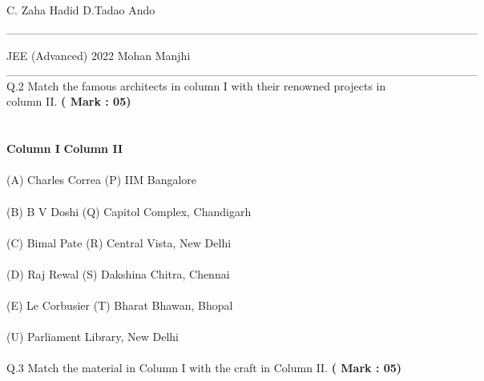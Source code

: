\documentclass[10pt]{article}
\begin{document}
\hspace*{4ex}C. Zaha Hadid   \tab D.Tadao Ando 
\\ \\
$$\textbf{------------------------------------------------------------------------------------------------------------------------------}$$
%
\begin{flushright}JEE (Advanced) 2022 \;\;\;\;\;\;\;\;\;\;\;\;\;\;\;\;\;\;\;\;\;\;\;\;\;\;\;\;\;\;\;\;\;\;\;\;\;\;\;\;\;\;\;\;\;\;\;\;\;\;\;\;\;\;\;\;\;\;\;\;\;\;\;\;\;\;\;\;\;\;\;\;\;\;\;\;\;\;\;\;\;\;\;\;\;\;\;\;\;\;\;\;\;\;\;\;\;\;\;\;\;\;\;\;\;\;\;\;\;\;\;Mohan Manjhi\end{flushright}
$$\textbf{------------------------------------------------------------------------------------------------------------------------------}$$
Q.2 Match the famous architects in column I with their renowned projects in column II. \hspace{10ex}\textbf{( Mark : 05)}\\
%
\\ \\ 
\hspace*{4ex}\textbf{Column I} \tab \textbf{Column II } 
\\ \\
\hspace*{4ex}(A) Charles Correa \tab (P) IIM Bangalore 
 \\ \\
\hspace*{4ex}(B) B V Doshi    \tab (Q)  Capitol Complex, Chandigarh 
\\ \\
\hspace*{4ex}(C) Bimal Pate \tab (R) Central Vista, New Delhi 
 \\ \\
\hspace*{4ex}(D)  Raj Rewal   \tab (S) Dakshina Chitra, Chennai  
\\ \\
\hspace*{4ex}(E)  Le Corbusier \tab (T) Bharat Bhawan, Bhopal 
 \\ \\
\hspace*{4ex} \tab (U) Parliament Library, New Delhi
\\ \\
%
Q.3 Match the material in Column I with the craft in Column II. \hspace{28ex}\textbf{( Mark : 05)}\\
\end{document}
